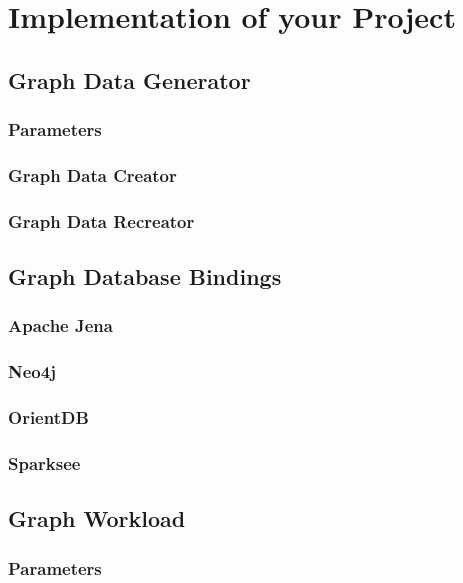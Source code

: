 \chapter{Implementation of your Project}
\label{ch:implementation}

\section{Graph Data Generator}

\subsection{Parameters}

\subsection{Graph Data Creator}

\subsection{Graph Data Recreator}

\section{Graph Database Bindings}
\subsection{Apache Jena}

\subsection{Neo4j}

\subsection{OrientDB}

\subsection{Sparksee}

\section{Graph Workload}

\subsection{Parameters}
